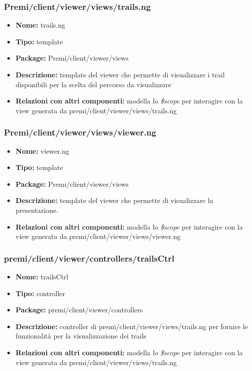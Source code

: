 \subsubsection{Premi/client/viewer/views/trails.ng}
\begin{itemize}
  \item[] \textbf{Nome:} trails.ng
  \item[] \textbf{Tipo:} template
  \item[] \textbf{Package:} Premi/client/viewer/views
  \item[] \textbf{Descrizione:} template del viewer che permette di visualizzare i trail disponibili per la scelta del percorso da visualizzare
  \item[] \textbf{Relazioni con altri componenti:} modella lo \textit{\$scope} per interagire con la view generata da premi/client/viewer/views/trails.ng
\end{itemize}
\subsubsection{Premi/client/viewer/views/viewer.ng}
\begin{itemize}
  \item[] \textbf{Nome:} viewer.ng
  \item[] \textbf{Tipo:} template
  \item[] \textbf{Package:} Premi/client/viewer/views
  \item[] \textbf{Descrizione:} template del viewer che permette di visualizzare la presentazione.
  \item[] \textbf{Relazioni con altri componenti:} modella lo \textit{\$scope} per interagire con la view generata da premi/client/viewer/views/viewer.ng
\end{itemize}
\subsubsection{premi/client/viewer/controllers/trailsCtrl}
\begin{itemize}
  \item[] \textbf{Nome:} trailsCtrl
  \item[] \textbf{Tipo:} controller
  \item[] \textbf{Package:} premi/client/viewer/controllers
  \item[] \textbf{Descrizione:} controller di premi/client/viewer/views/trails.ng per fornire le funzionalità per la visualizzazione dei trails
  \item[] \textbf{Relazioni con altri componenti:} modella lo \textit{\$scope} per interagire con la view generata da premi/client/viewer/views/trails.ng
\end{itemize}
